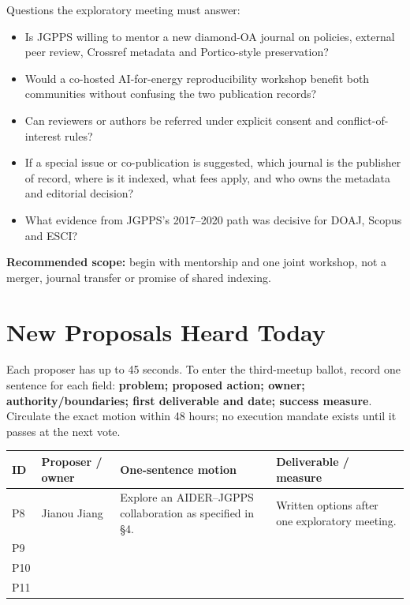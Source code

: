 \documentclass[11pt]{article}
\begin{document}
Questions the exploratory meeting must answer:
\begin{itemize}
\item Is JGPPS willing to mentor a new diamond-OA journal on policies, external peer review, Crossref metadata and Portico-style preservation?
\item Would a co-hosted AI-for-energy reproducibility workshop benefit both communities without confusing the two publication records?
\item Can reviewers or authors be referred under explicit consent and conflict-of-interest rules?
\item If a special issue or co-publication is suggested, which journal is the publisher of record, where is it indexed, what fees apply, and who owns the metadata and editorial decision?
\item What evidence from JGPPS's 2017--2020 path was decisive for DOAJ, Scopus and ESCI?
\end{itemize}

\textbf{Recommended scope:} begin with mentorship and one joint workshop, not a merger, journal transfer or promise of shared indexing.

\section{New Proposals Heard Today}

Each proposer has up to 45 seconds. To enter the third-meetup ballot, record one sentence for each field: \textbf{problem; proposed action; owner; authority/boundaries; first deliverable and date; success measure}. Circulate the exact motion within 48 hours; no execution mandate exists until it passes at the next vote.

{\small\renewcommand{\arraystretch}{1.35}
\begin{tabular}{@{}p{0.8cm} p{3cm} p{7cm} p{3.4cm}@{}}
\toprule
\textbf{ID} & \textbf{Proposer / owner} & \textbf{One-sentence motion} & \textbf{Deliverable / measure} \\
\midrule
P8 & Jianou Jiang & Explore an AIDER--JGPPS collaboration as specified in \S4. & Written options after one exploratory meeting. \\[10pt]
P9 & & & \\[18pt]
P10 & & & \\[18pt]
P11 & & & \\[18pt]
\bottomrule
\end{tabular}}
\end{document}
